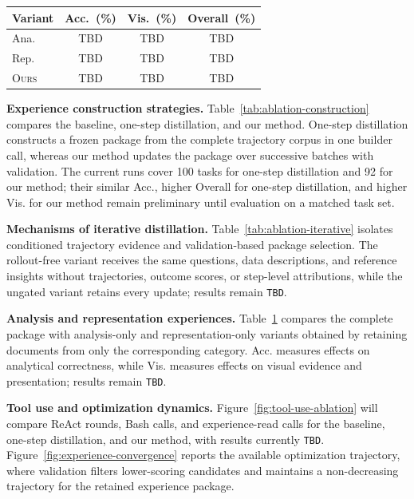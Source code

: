 \documentclass{article}
\newcommand{\floatstacksep}{\vspace{6pt}}
\newcommand{\method}{\textsc{Ours}}
\newcommand{\headpct}{(\%)}
\begin{document}
\begin{table}
  \floatstacksep

  \begin{minipage}{\linewidth}
    \centering
    \label{tab:ablation-experience-types}
    \begin{tabular}{@{}lccc@{}}
      \toprule
      Variant & Acc.~\headpct & Vis.~\headpct & Overall~\headpct \\
      \midrule
      Ana. & TBD & TBD & TBD \\
      Rep. & TBD & TBD & TBD \\
      \method{} & TBD & TBD & TBD \\
      \bottomrule
    \end{tabular}
  \end{minipage}
\end{table}

\noindent\textbf{Experience construction strategies.}
Table~\ref{tab:ablation-construction} compares the baseline, one-step distillation, and our method. One-step distillation constructs a frozen package from the complete trajectory corpus in one builder call, whereas our method updates the package over successive batches with validation. The current runs cover 100 tasks for one-step distillation and 92 for our method; their similar Acc., higher Overall for one-step distillation, and higher Vis. for our method remain preliminary until evaluation on a matched task set.

\noindent\textbf{Mechanisms of iterative distillation.}
Table~\ref{tab:ablation-iterative} isolates conditioned trajectory evidence and validation-based package selection. The rollout-free variant receives the same questions, data descriptions, and reference insights without trajectories, outcome scores, or step-level attributions, while the ungated variant retains every update; results remain \texttt{TBD}.

\noindent\textbf{Analysis and representation experiences.}
Table~\ref{tab:ablation-experience-types} compares the complete package with analysis-only and representation-only variants obtained by retaining documents from only the corresponding category. Acc. measures effects on analytical correctness, while Vis. measures effects on visual evidence and presentation; results remain \texttt{TBD}.

\noindent\textbf{Tool use and optimization dynamics.}
Figure~\ref{fig:tool-use-ablation} will compare ReAct rounds, Bash calls, and experience-read calls for the baseline, one-step distillation, and our method, with results currently \texttt{TBD}. Figure~\ref{fig:experience-convergence} reports the available optimization trajectory, where validation filters lower-scoring candidates and maintains a non-decreasing trajectory for the retained experience package.
\end{document}
